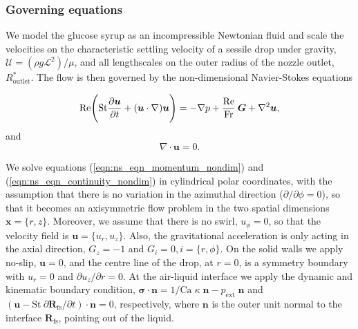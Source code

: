 \documentclass[aip,graphicx]{revtex4-1}
\newcommand{\sym}[1]{\text{#1}} \newcommand{\dif}{\mathrm{d}}
\newcommand{\vect}[1]{\bm{#1}}
\begin{document}
\subsubsection{Governing equations}

We model the glucose syrup as an incompressible Newtonian fluid
and scale the velocities on the characteristic settling velocity of a sessile drop
under gravity, $\mathcal{U}=(\rho g \mathcal{L}^2) / \mu$, and all
lengthscales on the outer radius of the nozzle outlet, $R_{\sym{outlet}}^*$. 
The flow is then
governed by the non-dimensional Navier-Stokes equations

\begin{equation}
 \sym{Re} \Bigg( \sym{St} \pder[\vect{u}]{t} + (\vect{u} \cdot \nabla)
 \vect{u} \Bigg) = - \nabla p + \frac{\sym{Re}}{\sym{Fr}} \: \vect{G}
 + \nabla^2 \vect{u},
 \label{eqn:ns_eqn_momentum_nondim}
\end{equation}
and
\begin{equation}
 \nabla \cdot \vect{u} = 0.
 \label{eqn:ns_eqn_continuity_nondim}
\end{equation}


We solve equations (\ref{eqn:ns_eqn_momentum_nondim}) and (\ref{eqn:ns_eqn_continuity_nondim}) in cylindrical polar coordinates, with the
assumption that there is no variation in the azimuthal direction
($\partial / \partial \phi = 0$), so that it becomes an axisymmetric
flow problem in the two spatial dimensions $\vect{x}=\{r,z\}$.
Moreover, we assume that there is no swirl, $u_{\phi}=0$, so that the
velocity field is $\vect{u}=\{u_r,u_z\}$.  Also, the gravitational
acceleration is only acting in the axial direction, $G_z = -1$ and
$G_i=0, i = \{ r,\phi \}$.  On the solid walls we apply no-slip,
$\vect{u} = 0$, and the centre line of the drop, at $r=0$, is a symmetry
boundary with $u_r = 0$ and $\partial u_z / \partial r = 0$.
At the air-liquid interface we apply the dynamic and kinematic
boundary condition,
 $\vect{\sigma} \cdot \vect{n} = 1/\sym{Ca} \; \kappa \; \vect{n}
-p_{\sym{ext}} \; \vect{n}$ and
 $( \vect{u} - \sym{St} \: \partial \vect{R}_{\sym{fs}} / \partial t ) \cdot \vect{n} = 0$, respectively,
where $\vect{n}$ is the outer unit normal to the interface $\vect{R}_{\sym{fs}}$,
pointing out of the liquid. 
\end{document}
